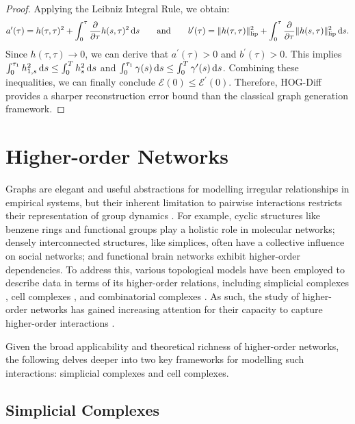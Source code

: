 \begin{proof}
Applying the Leibniz Integral Rule, we obtain:
\begin{equation}
a^\prime (\tau) = h(\tau,\tau)^2 + \int_0^{\tau} \frac{\partial}{\partial \tau} h(s, \tau)^2 \mathop{}\!\mathrm{d}{s} 
\qquad \mathrm{and} \qquad
b^\prime(\tau) = \|h(\tau,\tau)\|^2_{\operatorname{lip}} + \int_0^{\tau} \frac{\partial}{\partial \tau} \|h(s, \tau)\|^2_{\operatorname{lip}} \mathop{}\!\mathrm{d}{s}.
\end{equation}
Since $h(\tau,\tau) \rightarrow 0$, we can derive that $a^\prime (\tau)>0$ and $b^\prime (\tau)>0$. 
This implies $\int_0^{\tau_1} h_{1,s}^2 \mathop{}\!\mathrm{d}{s} \leq \int_0^T h_s^2 \mathop{}\!\mathrm{d}{s}$ and $\int_0^{\tau_1} \gamma(s) \mathop{}\!\mathrm{d}{s} \leq \int_0^T \gamma^{\prime}(s) \mathop{}\!\mathrm{d}{s}$.
Combining these inequalities, we can finally conclude $\mathcal{E}(0)\leq \mathcal{E}^\prime(0)$.
Therefore, HOG-Diff provides a sharper reconstruction error bound than the classical graph generation framework.
\end{proof}


\section{Higher-order Networks}
\label{app:ho-intro}
Graphs are elegant and useful abstractions for modelling irregular relationships in empirical systems, but their inherent limitation to pairwise interactions restricts their representation of group dynamics \cite{HigherOrderReview2020,xiao2022people}. 
% 
For example, cyclic structures like benzene rings and functional groups play a holistic role in molecular networks; densely interconnected structures, like simplices, often have a collective influence on social networks; and functional brain networks exhibit higher-order dependencies.
%
To address this, various topological models have been employed to describe data in terms of its higher-order relations, including simplicial complexes \cite{HiGCN2024}, cell complexes \cite{CWN+NeurIPS2021}, and combinatorial complexes \cite{combinatorial-complexes}.
%
As such, the study of higher-order networks has gained increasing attention for their capacity to capture higher-order interactions \cite{TDL-position+ICML2024,HoRW2024}.


Given the broad applicability and theoretical richness of higher-order networks, the following delves deeper into two key frameworks for modelling such interactions: simplicial complexes and cell complexes.

\subsection{Simplicial Complexes}

